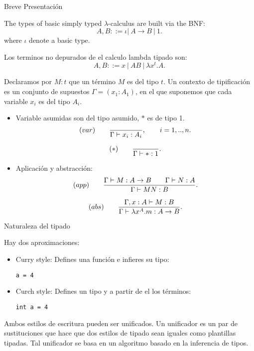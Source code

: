 \documentclass[usenames,dvipsnames]{beamer}
\begin{document}
\begin{frame}{Breve Presentación}
  \begin{definition}
    The types of basic simply typed $\lambda$-calculus are built via the BNF:
    $$A,B ::= \iota |\ A\to B \ |\ 1.$$
    where $\iota$ denote a basic type. 
  \end{definition}
\end{frame}
\begin{frame}
  \begin{definition}
Los terminos no depurados de el calculo lambda tipado son:
    $$A,B ::= x\ |\ AB\ |\ \lambda x^t.A .$$
  \end{definition}

   Declaramos por $M:t$ que un término $M$ es del tipo $t$. Un contexto de tipificación es un conjunto de supuestos $\Gamma = (x_1:A_1)$, en el que suponemos que cada variable $x_i$ es del tipo $A_i$.
\end{frame}

\begin{frame}

  \begin{definition}\label{def:typing-rules}
    \begin{itemize}
    \item  Variable asumidas son del tipo asumido, $*$ es de tipo 1.
      $$  (var)\qquad  {\displaystyle \over \Gamma \vdash x_i:A_i},\qquad  i=  1,..,n.$$

      $$  (*)\qquad  {\displaystyle \over \Gamma\vdash *:1}.$$

    \item Aplicación y abstracción:
      $$(app)\qquad  {\displaystyle \Gamma \vdash M:A\to B\qquad \Gamma \vdash N:A      \over \Gamma \vdash MN:B}.$$

      $$(abs)\qquad  {\displaystyle \Gamma, x: A\vdash M: B  \over \Gamma \vdash \lambda x^A.m:A\to B}.$$
    \end{itemize}
  \end{definition}
\end{frame}


\begin{frame}{Naturaleza del tipado}

  Hay dos aproximaciones:
  \begin{itemize}
  \item Curry style: Defines una función e infieres su tipo:
    \begin{center}
      \texttt{a = 4}
    \end{center}
  \item Curch style: Defines un tipo y a partir de el los términos:
    \begin{center}
      \texttt{int a = 4}
    \end{center}
  \end{itemize}
Ambos estilos de escritura pueden ser unificados. Un unificador es un par de sustituciones que hace que dos estilos de tipado sean iguales como plantillas tipadas. Tal unificador se basa en un algoritmo basado en la inferencia de tipos.
\end{frame}
\end{document}
